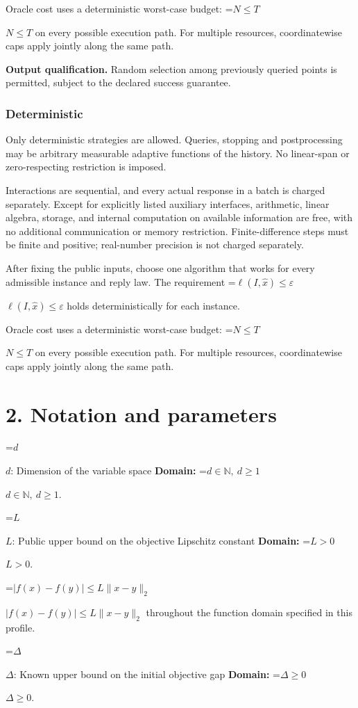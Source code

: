 \documentclass[10pt,a4paper]{article}
\newcommand{\AtlasMath}[1]{\par\begingroup\centering\setbox0=\hbox{$\displaystyle #1$}\ifdim\wd0>1.4\linewidth\typeout{ATLAS WIDE FORMULA: \the\wd0}\fi\ifdim\wd0>\linewidth\resizebox{\linewidth}{!}{\box0}\else\box0\fi\par\endgroup}
\newcommand{\AtlasInlineMath}[1]{\begingroup\setbox0=\hbox{$#1$}\ifdim\wd0>.4\linewidth\endgroup\AtlasMath{#1}\else\endgroup$#1$\fi}
\begin{document}
Oracle cost uses a deterministic worst-case budget: \AtlasInlineMath{N\le T} on every possible execution path. For multiple resources, coordinatewise caps apply jointly along the same path.

\textbf{Output qualification.} Random selection among previously queried points is permitted, subject to the declared success guarantee.

\subsubsection{Deterministic}
Only deterministic strategies are allowed. Queries, stopping and postprocessing may be arbitrary measurable adaptive functions of the history. No linear-span or zero-respecting restriction is imposed.

Interactions are sequential, and every actual response in a batch is charged separately. Except for explicitly listed auxiliary interfaces, arithmetic, linear algebra, storage, and internal computation on available information are free, with no additional communication or memory restriction. Finite-difference steps must be finite and positive; real-number precision is not charged separately.

After fixing the public inputs, choose one algorithm that works for every admissible instance and reply law. The requirement \AtlasInlineMath{\ell(I,\widehat{x})\le \varepsilon} holds deterministically for each instance.

Oracle cost uses a deterministic worst-case budget: \AtlasInlineMath{N\le T} on every possible execution path. For multiple resources, coordinatewise caps apply jointly along the same path.

\section{2. Notation and parameters}
\AtlasInlineMath{d}: Dimension of the variable space \textbf{Domain:} \AtlasInlineMath{d\in\mathbb{N},\ d\ge1}.

\AtlasInlineMath{L}: Public upper bound on the objective Lipschitz constant \textbf{Domain:} \AtlasInlineMath{L>0}.

\AtlasInlineMath{|f(x)-f(y)|\le L\|x-y\|_2} throughout the function domain specified in this profile.

\AtlasInlineMath{\Delta}: Known upper bound on the initial objective gap \textbf{Domain:} \AtlasInlineMath{\Delta\ge0}.
\end{document}
